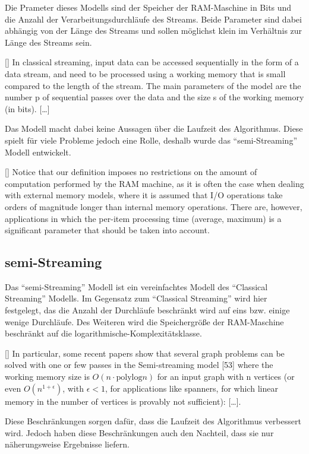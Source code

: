 Die Prameter dieses Modells sind der Speicher der \gls{RAM}-Maschine in Bits und
die Anzahl der Verarbeitungsdurchläufe des Streams. Beide Parameter sind dabei
abhängig von der Länge des Streams und sollen möglichst klein im Verhältnis zur
Länge des Streams sein.

[\cite{Ribichini2007}]{
In classical streaming, input data can be accessed sequentially in the form
of a data stream, and need to be processed using a working memory that
is small compared to the length of the stream. The main parameters of the
model are the number p of sequential passes over the data and the size s of the
working memory (in bits). [\dots]
}

Das Modell macht dabei keine Aussagen über die Laufzeit des Algorithmus. Diese
spielt für viele Probleme jedoch eine Rolle, deshalb wurde das
\enquote{semi-Streaming} Modell entwickelt.

[\cite{Ribichini2007}]{
Notice that our definition imposes no restrictions on the amount
of computation performed by the RAM machine, as it is often the case when
dealing with external memory models, where it is assumed that I/O operations
take orders of magnitude longer than internal memory operations. There
are, however, applications in which the per-item processing time (average,
maximum) is a significant parameter that should be taken into account.
}

\subsection{semi-Streaming}
Das \enquote{semi-Streaming} Modell ist ein vereinfachtes Modell des
\enquote{Classical Streaming} Modells. Im Gegensatz zum \enquote{Classical Streaming}
wird hier festgelegt, das die Anzahl der Durchläufe beschränkt wird auf eins bzw.
einige wenige Durchläufe. Des Weiteren wird die Speichergröße der RAM-Maschine
beschränkt auf die logarithmische-Komplexitätsklasse.

[\cite{Ribichini2007}]{
In particular, some recent papers show that several graph problems can be
solved with one or few passes in the Semi-streaming model [53] where the
working memory size is $O(n · \text{polylog} n)$ for an input graph with n
vertices (or even $O(n^{1 + \epsilon})$, with $\epsilon < 1$, for applications
like spanners, for which linear memory in the number of vertices is provably not
sufficient): [\dots].
}

Diese Beschränkungen sorgen dafür, dass die Laufzeit des Algorithmus verbessert
wird. Jedoch haben diese Beschränkungen auch den Nachteil, dass sie nur
näherungsweise Ergebnisse liefern.

